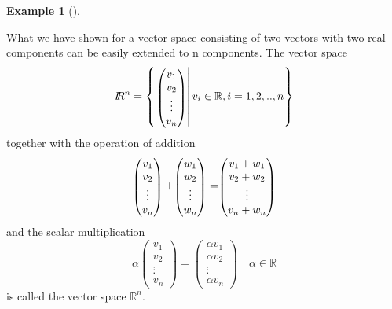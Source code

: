 \documentclass[
  a4paper,
  DIV=11,
  numbers=noendperiod,
  oneside]{scrreprt}
\theoremstyle{definition}
\newtheorem{example}{Example}[chapter]
\theoremstyle{remark}
\begin{document}
\begin{example}[]\protect\hypertarget{exm-vktspace4}{}\label{exm-vktspace4}

What we have shown for a vector space consisting of two vectors with two
real components can be easily extended to n components. The vector space
\[I\!\!R^{n} = \left\{ \left. \scriptscriptstyle \begin{pmatrix}   v_{1}\\ v_{2} \\ \vdots \\ v_{n}  \end{pmatrix} \textstyle \right| v_{i} \in \mathbb{R}, i=1,2, .. ,n \right\}\]
together with the operation of addition
\[\scriptscriptstyle \begin{pmatrix}   v_{1}\\ v_{2} \\ \vdots \\ v_{n}  \end{pmatrix} \textstyle +  \scriptscriptstyle \begin{pmatrix}   w_{1}\\ w_{2} \\ \vdots \\ w_{n}  \end{pmatrix} \textstyle =  \scriptscriptstyle \begin{pmatrix}   v_{1}+w_{1}\\ v_{2} +w_{2}\\ \vdots \\ v_{n}+w_{n}  \end{pmatrix} \textstyle\]
and the scalar multiplication
\[ \alpha \scriptscriptstyle \begin{pmatrix}   v_{1}\\ v_{2} \\ \vdots \\ v_{n}  \end{pmatrix} \textstyle =  \scriptscriptstyle \begin{pmatrix}    \alpha v_{1}\\  \alpha v_{2} \\ \vdots \\  \alpha v_{n}  \end{pmatrix} \textstyle \quad \alpha \in \mathbb{R}\]
is called the vector space \(\mathbb{R}^{n}\).


\end{example}
\end{document}
